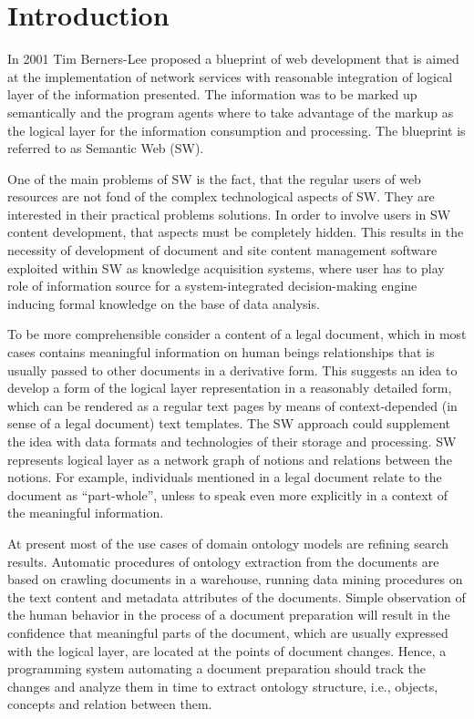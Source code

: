 \documentclass[conference]{IEEEtran}
\begin{document}
\section{Introduction}
In 2001 Tim Berners-Lee proposed a blueprint \cite{TBL2001} of web
development that is aimed at the implementation of network services
with reasonable integration of logical layer of the information
presented.  The information was to be marked up semantically and the
program agents where to take advantage of the markup as the logical
layer for the information consumption and processing.  The blueprint
is referred to as Semantic Web (SW).

One of the main problems of SW is the fact, that the regular users of
web resources are not fond of the complex technological aspects of SW.
They are interested in their practical problems solutions.  In order
to involve users in SW content development, that aspects must be
completely hidden.  This results in the necessity of development of
document and site content management software exploited within SW as
knowledge acquisition systems, where user has to play role of
information source for a system-integrated decision-making engine
inducing formal knowledge on the base of data analysis.

To be more comprehensible consider a content of a legal document,
which in most cases contains meaningful information on human beings
relationships that is usually passed to other documents in a
derivative form.  This suggests an idea to develop a form of the
logical layer representation in a reasonably detailed form, which can
be rendered as a regular text pages by means of context-depended (in
sense of a legal document) text templates.  The SW approach could
supplement the idea with data formats and technologies of their
storage and processing.  SW represents logical layer as a network graph
of notions and relations between the notions.  For example, individuals
mentioned in a legal document relate to the document as
“part-whole”, unless to speak even more explicitly in a context of
the meaningful information.

At present most of the use cases of domain ontology models are
refining search results.  Automatic procedures of ontology extraction
from the documents are based on crawling documents in a warehouse,
running data mining procedures on the text content and metadata
attributes of the documents.  Simple observation of the human behavior
in the process of a document preparation will result in the confidence
that meaningful parts of the document, which are usually expressed
with the logical layer, are located at the points of document changes.
Hence, a programming system automating a document preparation should
track the changes and analyze them in time to extract ontology structure,
i.e., objects, concepts and relation between them.
\end{document}
